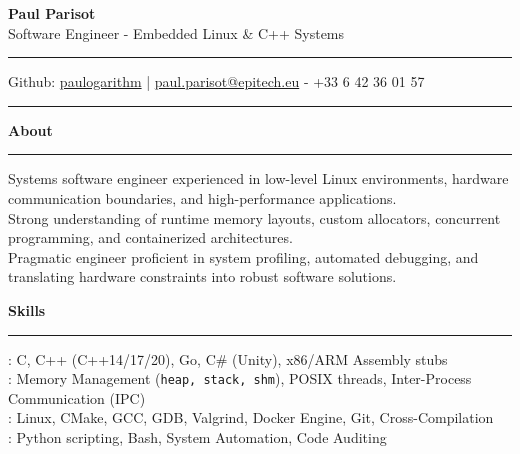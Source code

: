 \documentclass[9pt]{extarticle}
\begin{document}
\begin{center}
    {\huge\bfseries Paul Parisot}
    \\[10pt]
    {\Large Software Engineer - Embedded Linux \& C++ Systems}
    \\
\end{center}

\par\vspace{-10pt}
\rule{\linewidth}{0.4pt}
\par\vspace{-10pt}

\begin{center}
    Github: \href{https://github.com/paulogarithm}{paulogarithm}
    \quad | \quad 
    \href{mailto:paul.parisot@epitech.eu}{paul.parisot@epitech.eu} - +33 6 42 36 01 57
\end{center}

\par\vspace{-15pt}
\rule{\linewidth}{0.4pt}
\par\vspace{5pt}

{\large\bfseries About}
\par\vspace{-8pt}
\rule{\linewidth}{0.4pt}
\par\vspace{5pt}

Systems software engineer experienced in low-level Linux environments, hardware communication boundaries, and high-performance applications. \\
Strong understanding of runtime memory layouts, custom allocators, concurrent programming, and containerized architectures. \\
Pragmatic engineer proficient in system profiling, automated debugging, and translating hardware constraints into robust software solutions.

\par\vspace{5pt}

{\large\bfseries Skills}
\par\vspace{-8pt}
\rule{\linewidth}{0.4pt}
\par\vspace{5pt}

\hspace*{5pt}{\bfseries Core Systems}: C, C++ (C++14/17/20), Go, C\# (Unity), x86/ARM Assembly stubs \\
\hspace*{5pt}{\bfseries OS \& Memory}: Memory Management (\texttt{heap, stack, shm}), POSIX threads, Inter-Process Communication (IPC) \\
\hspace*{5pt}{\bfseries DevTools \& Infrastructure}: Linux, CMake, GCC, GDB, Valgrind, Docker Engine, Git, Cross-Compilation \\
\hspace*{5pt}{\bfseries Automation \& Scripting}: Python scripting, Bash, System Automation, Code Auditing
\end{document}
